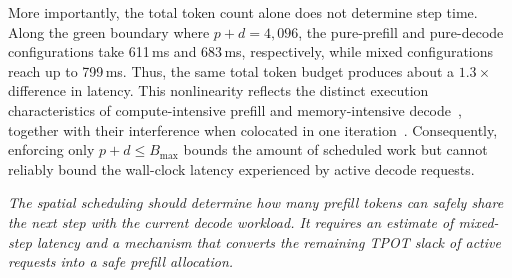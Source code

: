 More importantly, the total token count alone does not determine step time.
Along the green boundary where $p+d=4{,}096$, the pure-prefill and pure-decode configurations take 611\,ms and 683\,ms, respectively, while mixed configurations reach up to 799\,ms.
Thus, the same total token budget produces about a $1.3\times$ difference in latency.
This nonlinearity reflects the distinct execution characteristics of compute-intensive prefill and memory-intensive decode~\cite{pope2023scaling,kamath2025pod}, together with their interference when colocated in one iteration~\cite{agrawal2024sarathi,patel2024splitwise}.
Consequently, enforcing only $p+d\leq B_{\max}$ bounds the amount of scheduled work but cannot reliably bound the wall-clock latency experienced by active decode requests.

\textit{The spatial scheduling should determine how many prefill tokens can safely share the next step with the current decode workload.
It requires an estimate of mixed-step latency and a mechanism that converts the remaining TPOT slack of active requests into a safe prefill allocation.}

